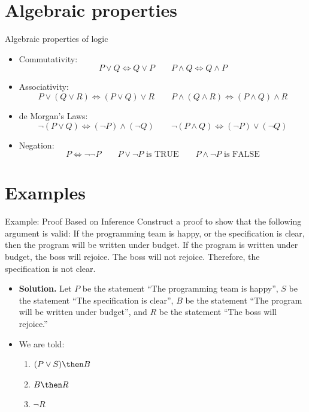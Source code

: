 \documentclass[12pt,aspectratio=1610, handout]{beamer}
\begin{document}
\section{Algebraic properties}
\begin{frame}{Algebraic properties of logic}
	\begin{itemize}
		\item Commutativity: 
		\[
		P \vee Q \iff Q \vee P \qquad P \wedge Q \iff Q \wedge P
		\]
		\item Associativity: 
		\[
		P \vee (Q \vee R) \iff (P \vee Q) \vee R \qquad P \wedge (Q \wedge R) \iff (P \wedge Q) \wedge R
		\]
		\item de Morgan's Laws:
		\[
		\neg (P \vee Q) \iff (\neg P) \wedge (\neg Q) \qquad \neg(P \wedge Q) \iff (\neg P) \vee(\neg Q)
		\]
		\item Negation: 
		\[
		P \iff \neg\neg P \qquad P \vee \neg P \textrm{ is TRUE} \qquad P \wedge \neg P \textrm{ is FALSE}
		\]
	\end{itemize}
\end{frame}

\section{Examples}
\begin{frame}{Example: Proof Based on Inference}
	Construct a proof to show that the following argument is valid: 
	\newline
	If the programming team is happy, or the specification is clear, then the program will be written under budget. If the program is written under budget, the boss will rejoice. The boss will not rejoice. Therefore, the specification is not clear.\\
	\vspace{3mm}
	
	\begin{itemize}\itemsep2mm
		\item \textbf{Solution.} Let $P$ be the statement ``The programming team is happy'', $S$ be the statement ``The specification is clear'', $B$ be the statement ``The program will be written under budget'', and $R$ be the statement ``The boss will rejoice.'' 
		\item We are told: 
		\begin{enumerate}
			\item $(P \vee S) \then B$
			\item $B \then R$
			\item $\neg R$
		\end{enumerate}
	\end{itemize}
	\vspace{3in}
\end{frame}
\end{document}
